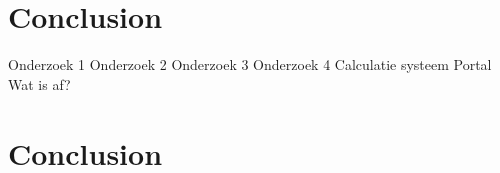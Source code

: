 \graphicspath{{Chapter7/Figs/Vector/}{Chapter7/Figs/}}

%
\chapter{Conclusion}

Onderzoek 1
Onderzoek 2
Onderzoek 3
Onderzoek 4
Calculatie systeem
Portal
Wat is af?

%
\chapter{Conclusion}
